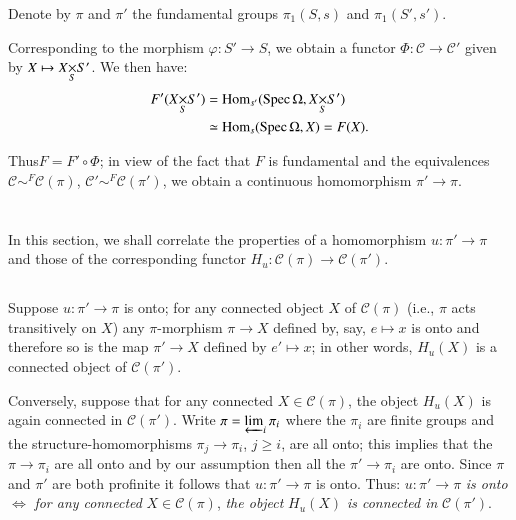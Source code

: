 Denote by $\pi$ and $\pi'$ the fundamental groups $\pi_{1}(S,s)$ and
$\pi_{1}(S',s')$. 

Corresponding to the morphism $\varphi:S'\to S$, we obtain a functor
$\Phi:\mathscr{C}\to \mathscr{C}'$ given by $X\mapsto
\fprod{X}{S'}{S}$. We then have:
\begin{align*}
F'(\fprod{X}{S'}{S}) &= \Hom_{s'}(\Spec \Omega, \fprod{X}{S'}{S})\\
&\simeq \Hom_{s}(\Spec \Omega,X)=F(X).
\end{align*}

Thus\pageoriginale $F=F'\circ\Phi$; in view of the fact that $F$ is
fundamental and the equivalences
$\mathscr{C}{\displaystyle{\mathop{\sim}^{F}}}\mathscr{C}(\pi)$,
$\mathscr{C}'{\displaystyle{\mathop{\sim}^{F}}}\mathscr{C}(\pi')$, we
obtain a continuous homomorphism $\pi'\to \pi$.

\section{}\label{chap5-sec5.2}
In this section, we shall correlate the properties of a homomorphism
$u:\pi'\to \pi$ and those of the corresponding functor
$H_{u}:\mathscr{C}(\pi)\to \mathscr{C}(\pi')$. 

\subsection{}\label{chap5-sec5.2.1}
Suppose $u:\pi'\to \pi$ is onto; for any connected object $X$ of
$\mathscr{C}(\pi)$ (i.e., $\pi$ acts transitively on $X$) any
$\pi$-morphism $\pi\to X$ defined by, say, $e\mapsto x$ is onto and
therefore so is the map $\pi'\to X$ defined by $e'\mapsto x$; in other
words, $H_{u}(X)$ is a connected object of $\mathscr{C}(\pi')$.

Conversely, suppose that for any connected $X\in\mathscr{C}(\pi)$, the
object $H_{u}(X)$ is again connected in $\mathscr{C}(\pi')$. Write
$\pi=\varprojlim_{i}\pi_{i}$ where the $\pi_{i}$ are finite groups and
the structure-homomorphisms $\pi_{j}\to \pi_{i}$, $j\geq i$, are all
onto; this implies that the $\pi\to \pi_{i}$ are all onto and by our
assumption then all the $\pi'\to \pi_{i}$ are onto. Since $\pi$ and
$\pi'$ are both profinite it follows that $u:\pi'\to \pi$ is
onto. Thus: $u:\pi'\to \pi$ {\em is onto} $\Leftrightarrow$ {\em for
  any connected} $X\in \mathscr{C}(\pi)$, {\em the object} $H_{u}(X)$
{\em is connected in} $\mathscr{C}(\pi')$. 

